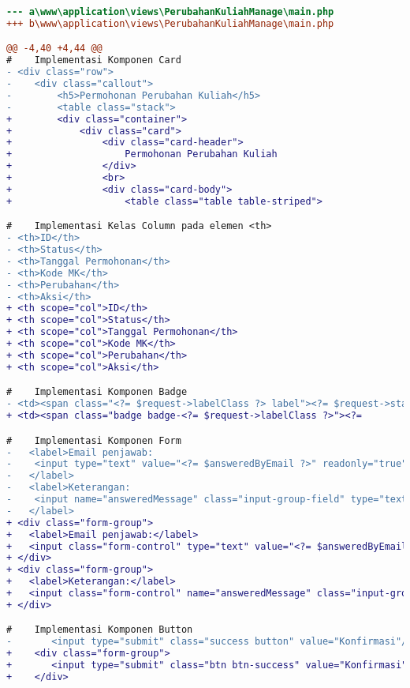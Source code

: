 \begin{lstlisting}[language=diff, caption=Perubahan file \path{\views\PerubahanKuliahManage\main.php},  basicstyle=\ttfamily, frame=single,
columns=fullflexible, keepspaces=true, breaklines=true, label={lst:mainPerubahanKuliahManage}]
--- a\www\application\views\PerubahanKuliahManage\main.php
+++ b\www\application\views\PerubahanKuliahManage\main.php

@@ -4,40 +4,44 @@
#    Implementasi Komponen Card
- <div class="row">
-    <div class="callout">
-        <h5>Permohonan Perubahan Kuliah</h5>
-        <table class="stack">
+        <div class="container">
+            <div class="card">
+                <div class="card-header">
+                    Permohonan Perubahan Kuliah
+                </div>
+                <br>
+                <div class="card-body">
+                    <table class="table table-striped">

#    Implementasi Kelas Column pada elemen <th>
- <th>ID</th>
- <th>Status</th>
- <th>Tanggal Permohonan</th>
- <th>Kode MK</th>
- <th>Perubahan</th>
- <th>Aksi</th>
+ <th scope="col">ID</th>
+ <th scope="col">Status</th>
+ <th scope="col">Tanggal Permohonan</th>
+ <th scope="col">Kode MK</th>
+ <th scope="col">Perubahan</th>
+ <th scope="col">Aksi</th>

#    Implementasi Komponen Badge
- <td><span class="<?= $request->labelClass ?> label"><?= $request->status ?></span></td>
+ <td><span class="badge badge-<?= $request->labelClass ?>"><?= 

#    Implementasi Komponen Form
-   <label>Email penjawab:
-    <input type="text" value="<?= $answeredByEmail ?>" readonly="true"/>
-   </label>
-   <label>Keterangan:
-    <input name="answeredMessage" class="input-group-field" type="text"/>
-   </label>
+ <div class="form-group">
+   <label>Email penjawab:</label>
+   <input class="form-control" type="text" value="<?= $answeredByEmail ?>" readonly="true"/>
+ </div>
+ <div class="form-group">
+   <label>Keterangan:</label>
+   <input class="form-control" name="answeredMessage" class="input-group-field" type="text"/>
+ </div>

#    Implementasi Komponen Button                                             
-    	<input type="submit" class="success button" value="Konfirmasi"/>
+    <div class="form-group">
+       <input type="submit" class="btn btn-success" value="Konfirmasi"/>
+    </div>


\end{lstlisting}

